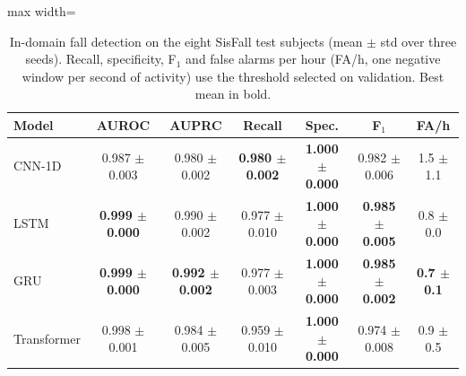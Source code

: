 \begin{table}[ht]
\centering
\footnotesize
\caption{In-domain fall detection on the eight SisFall test subjects (mean $\pm$ std over three seeds). Recall, specificity, F$_1$ and false alarms per hour (FA/h, one negative window per second of activity) use the threshold selected on validation. Best mean in bold.}
\label{tab:sisfall}
\setlength{\tabcolsep}{4pt}
\begin{adjustbox}{max width=\textwidth}
\begin{tabular}{lcccccc}
\toprule
Model & AUROC & AUPRC & Recall & Spec. & F$_1$ & FA/h \\
\midrule
CNN-1D & 0.987 $\pm$ 0.003 & 0.980 $\pm$ 0.002 & \textbf{0.980 $\pm$ 0.002} & \textbf{1.000 $\pm$ 0.000} & 0.982 $\pm$ 0.006 & 1.5 $\pm$ 1.1 \\
LSTM & \textbf{0.999 $\pm$ 0.000} & 0.990 $\pm$ 0.002 & 0.977 $\pm$ 0.010 & \textbf{1.000 $\pm$ 0.000} & \textbf{0.985 $\pm$ 0.005} & 0.8 $\pm$ 0.0 \\
GRU & \textbf{0.999 $\pm$ 0.000} & \textbf{0.992 $\pm$ 0.002} & 0.977 $\pm$ 0.003 & \textbf{1.000 $\pm$ 0.000} & \textbf{0.985 $\pm$ 0.002} & \textbf{0.7 $\pm$ 0.1} \\
Transformer & 0.998 $\pm$ 0.001 & 0.984 $\pm$ 0.005 & 0.959 $\pm$ 0.010 & \textbf{1.000 $\pm$ 0.000} & 0.974 $\pm$ 0.008 & 0.9 $\pm$ 0.5 \\
\bottomrule
\end{tabular}
\end{adjustbox}
\end{table}